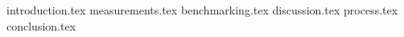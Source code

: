 \documentclass[BSP,english,oneside]{ntnuthesis/ntnubachelorthesis}
\begin{document}


\makefrontpages 



\tableofcontents
\listoffigures
\listoftables





{introduction.tex}
{measurements.tex}
{benchmarking.tex}
{discussion.tex}
{process.tex}
{conclusion.tex}




\appendix %
%
%
%
%
\end{document}
